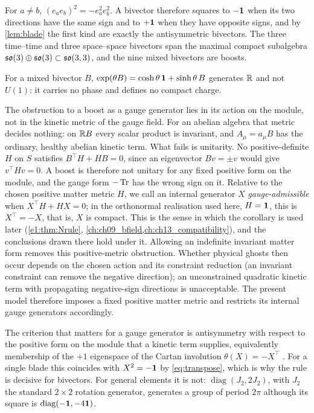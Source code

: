 \begin{theorem}
\label{thm:sig}
For $a\neq b$, $(e_ae_b)^2=-e_a^2e_b^2$. A bivector therefore squares to $-\mathbf 1$ when its two directions have the same
sign and to $+\mathbf 1$ when they have opposite signs, and by \cref{lem:blade} the first kind are exactly the antisymmetric
bivectors. The three time--time and three space--space bivectors span the maximal compact subalgebra
$\mathfrak{so}(3)\oplus\mathfrak{so}(3)\subset\mathfrak{so}(3,3)$, and the nine mixed bivectors are boosts.
\end{theorem}

\begin{corollary}
\label{cor:noboost}
For a mixed bivector $B$, $\exp(\theta B)=\cosh\theta\,\mathbf 1+\sinh\theta\,B$ generates $\mathbb{R}$ and not $U(1)$: it carries no
phase and defines no compact charge.
\end{corollary}

The obstruction to a boost as a gauge generator lies in its action on the module, not in the kinetic metric of the gauge field. For an
abelian algebra that metric decides nothing: on $\mathbb{R} B$ every scalar product is invariant, and $A_\mu=a_\mu B$ has the ordinary, healthy
abelian kinetic term. What fails is unitarity. No positive-definite $H$ on $S$ satisfies $B^{\!\top}H+HB=0$, since an eigenvector $Bv=\pm v$
would give $v^{\!\top}Hv=0$. A boost is therefore not unitary for any fixed positive form on the module, and the gauge form $-\operatorname{Tr}$ has the
wrong sign on it. Relative to the chosen positive matter metric $H$, we call an internal generator $X$ \emph{gauge-admissible} when
$X^{\!\top}H+HX=0$; in the orthonormal realisation used here, $H=\mathbf 1$, this is $X^{\!\top}=-X$, that is, $X$ is compact. This is the sense in which the corollary is used later (\cref{e1:thm:Nrule}, \cref{ch:ch09_bfield,ch:ch13_compatibility}),
and the conclusions drawn there hold under it. Allowing an indefinite invariant matter form removes this positive-metric obstruction.
Whether physical ghosts then occur depends on the chosen action and its constraint reduction (an invariant constraint can remove the
negative direction); an unconstrained quadratic kinetic term with propagating negative-sign directions is unacceptable. The present model
therefore imposes a fixed positive matter metric and restricts its internal gauge generators accordingly.

The criterion that matters for a gauge generator is antisymmetry with respect to the positive form on the module that a kinetic term
supplies, equivalently membership of the $+1$ eigenspace of the Cartan involution $\theta(X)=-X^{\!\top}$
\cite{Knapp,Helgason}. For a single blade this coincides with $X^2=-\mathbf 1$ by \eqref{eq:transpose}, which is why the rule is
decisive for bivectors. For general elements it is not: $\operatorname{diag}(J_2,2J_2)$, with $J_2$ the standard $2\times2$
rotation generator, generates a group of period $2\pi$ although its square is $\operatorname{diag}(-\mathbf 1,-4\mathbf 1)$.

